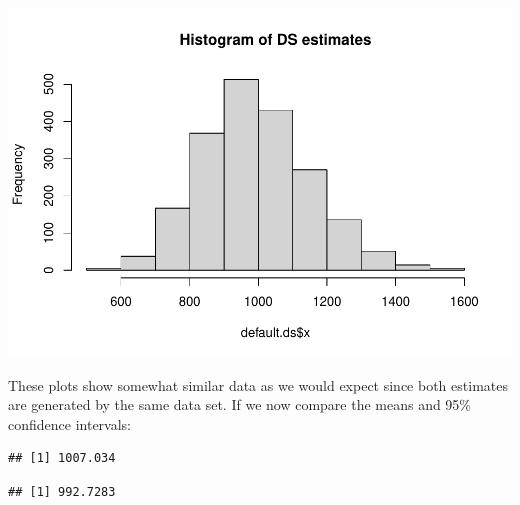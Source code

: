 \documentclass[
]{article}
\newenvironment{Shaded}{\begin{snugshade}}{\end{snugshade}}
\newcommand{\AttributeTok}[1]{\textcolor[rgb]{0.77,0.63,0.00}{#1}}
\newcommand{\FunctionTok}[1]{\textcolor[rgb]{0.00,0.00,0.00}{#1}}
\newcommand{\NormalTok}[1]{#1}
\newcommand{\SpecialCharTok}[1]{\textcolor[rgb]{0.00,0.00,0.00}{#1}}
\newcommand{\StringTok}[1]{\textcolor[rgb]{0.31,0.60,0.02}{#1}}
\begin{document}
\begin{Shaded}
\end{Shaded}

\includegraphics{project-report_files/figure-latex/unnamed-chunk-2-2.pdf}

These plots show somewhat similar data as we would expect since both
estimates are generated by the same data set. If we now compare the
means and 95\% confidence intervals:

\begin{Shaded}
\end{Shaded}

\begin{verbatim}
## [1] 1007.034
\end{verbatim}

\begin{Shaded}
\end{Shaded}

\begin{verbatim}
## [1] 992.7283
\end{verbatim}
\end{document}
